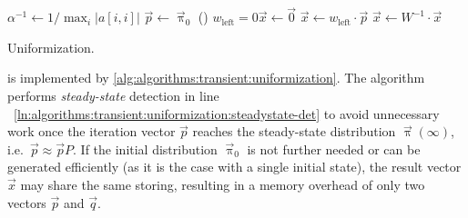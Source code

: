 \begin{algorithm}
  \;
  $\alpha^{-1} \gets 1 / \max_{i} \lvert a[i,i] \rvert$
  \label{ln:algorithms:transient:uniformization:alpha}\;
  $\vec{p} \gets \vec{\uppi}_0$\;
  \leIf()
  {$w_{\text{left}} = 0$}{$\vec{x} \gets \vec{0}$}
  {$\vec{x} \gets w_{\text{left}} \cdot \vec{p}$}
  $\vec{x} \gets W^{-1} \cdot \vec{x}$
  \;
  \caption{Uniformization.}
  \label{alg:algorithms:transient:uniformization}
\end{algorithm}

 is implemented by
\vref{alg:algorithms:transient:uniformization}. The algorithm performs
\emph{steady-state} detection in line%
~\ref{ln:algorithms:transient:uniformization:steadystate-det} to avoid
unnecessary work once the iteration vector $\vec{p}$ reaches the
steady-state distribution $\vec{\uppi}(\infty)$,
i.e.~$\vec{p} \approx \vec{p} P$. If the initial distribution
$\vec{\uppi}_0$ is not further needed or can be generated efficiently
(as it is the case with a single initial state), the result vector
$\vec{x}$ may share the same storing, resulting in a memory overhead
of only two vectors $\vec{p}$ and $\vec{q}$.

